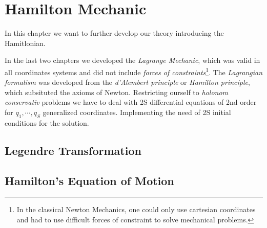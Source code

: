 \chapter{Hamilton Mechanic}
In this chapter we want to further develop our theory introducing the
Hamitlonian.

In the last two chapters we developed the \textit{Lagrange Mechanic}, which was
valid in all coordinates systems and did not include \textit{forces of
constraints}\footnote{In the classical Newton Mechanics, one could only use
cartesian coordinates and had to use difficult forces of constraint to solve
mechanical problems.}. The \textit{Lagrangian formalism} was developed from the
\textit{d'Alembert principle} or \textit{Hamilton principle}, which subsituted
the axioms of Newton. Restricting ourself to \textit{holonom conservativ}
problems we have to deal with 2S differential equations of 2nd order for $q_1,
\cdots, q_S$ generalized coordinates. Implementing the need of 2S initial
conditions for the solution. 
\section{Legendre Transformation}
\section{Hamilton's Equation of Motion}
